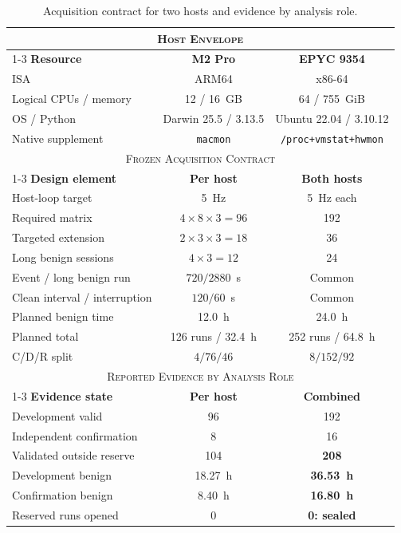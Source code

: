 \begin{table}[!t]
\centering
\caption{Acquisition contract for two hosts and evidence by analysis role.}
\label{tab:prism_experimental_setup}

{\footnotesize
\setlength{\tabcolsep}{2.0pt}
\renewcommand{\arraystretch}{1.00}

\begin{tabular*}{\columnwidth}{
    @{\extracolsep{\fill}}
    lcc
    @{}
}
\toprule

\multicolumn{3}{c}{\textsc{Host Envelope}} \\
\cmidrule(lr){1-3}
\textbf{Resource} & \textbf{M2 Pro} & \textbf{EPYC 9354} \\
\midrule
ISA                    & ARM64                 & x86-64 \\
Logical CPUs / memory           & 12 / 16~GB            & 64 / 755~GiB \\
OS / Python            & Darwin 25.5 / 3.13.5 & Ubuntu 22.04 / 3.10.12 \\
Native supplement          & \texttt{macmon}       & \texttt{/proc+vmstat+hwmon} \\

\midrule
\multicolumn{3}{c}{\textsc{Frozen Acquisition Contract}} \\
\cmidrule(lr){1-3}
\textbf{Design element} & \textbf{Per host} & \textbf{Both hosts} \\
\midrule
Host-loop target & 5~Hz & 5~Hz each \\
Required matrix        & $4{\times}8{\times}3=96$ & 192 \\
Targeted extension     & $2{\times}3{\times}3=18$ & 36 \\
Long benign sessions            & $4{\times}3=12$          & 24 \\
Event / long benign run     & $720/2880$~s             & Common \\
Clean interval / interruption & $120/60$~s             & Common \\
Planned benign time    & 12.0~h                   & 24.0~h \\
Planned total          & 126 runs / 32.4~h        & 252 runs / 64.8~h \\
C/D/R split            & $4/76/46$                & $8/152/92$ \\

\midrule
\multicolumn{3}{c}{\textsc{Reported Evidence by Analysis Role}} \\
\cmidrule(lr){1-3}
\textbf{Evidence state} & \textbf{Per host} & \textbf{Combined} \\
\midrule
Development valid      & 96           & 192 \\
Independent confirmation & 8          & 16 \\
Validated outside reserve & 104          & \textbf{208} \\
Development benign     & 18.27~h      & \textbf{36.53~h} \\
Confirmation benign    & 8.40~h       & \textbf{16.80~h} \\
Reserved runs opened      & 0            & \textbf{0: sealed} \\


\end{tabular*}}
\end{table}
